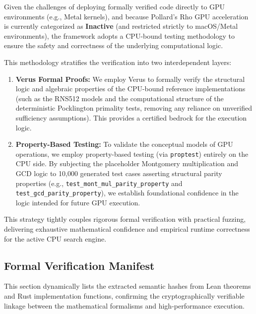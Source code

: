 Given the challenges of deploying formally verified code directly to GPU environments (e.g., Metal kernels), and because Pollard's Rho GPU acceleration is currently categorized as \textbf{Inactive} (and restricted strictly to macOS/Metal environments), the framework adopts a CPU-bound testing methodology to ensure the safety and correctness of the underlying computational logic.

This methodology stratifies the verification into two interdependent layers:
\begin{enumerate}
    \item \textbf{Verus Formal Proofs:} We employ Verus to formally verify the structural logic and algebraic properties of the CPU-bound reference implementations (such as the RNS512 models and the computational structure of the deterministic Pocklington primality tests, removing any reliance on unverified sufficiency assumptions). This provides a certified bedrock for the execution logic.
    \item \textbf{Property-Based Testing:} To validate the conceptual models of GPU operations, we employ property-based testing (via \texttt{proptest}) entirely on the CPU side. By subjecting the placeholder Montgomery multiplication and GCD logic to 10,000 generated test cases asserting structural parity properties (e.g., \texttt{test\_mont\_mul\_parity\_property} and \texttt{test\_gcd\_parity\_property}), we establish foundational confidence in the logic intended for future GPU execution.
\end{enumerate}

This strategy tightly couples rigorous formal verification with practical fuzzing, delivering exhaustive mathematical confidence and empirical runtime correctness for the active CPU search engine.

\subsection{Formal Verification Manifest}
\label{app:subsec:verification_manifest}
This section dynamically lists the extracted semantic hashes from Lean theorems and Rust implementation functions, confirming the cryptographically verifiable linkage between the mathematical formalisms and high-performance execution.


